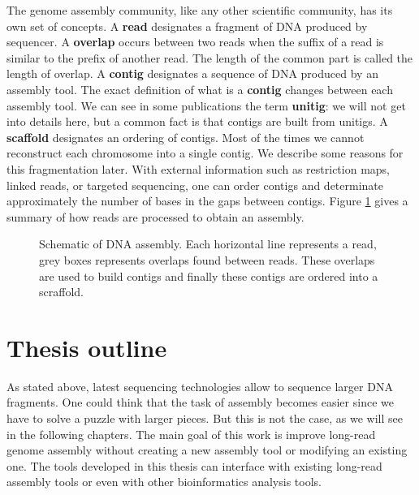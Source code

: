 \documentclass[./main.tex]{subfiles}
\begin{document}
\bigskip

The genome assembly community, like any other scientific community, has its own set of concepts. 
%
A \textbf{read} designates a fragment of DNA produced by sequencer.
%
A \textbf{overlap} occurs between two reads when the suffix of a read is similar to the prefix of another read. The length of the common part is called the length of overlap.
%
A \textbf{contig} designates a sequence of DNA produced by an assembly tool. The exact definition of what is a \textbf{contig} changes between each assembly tool. We can see in some publications the term \textbf{unitig}: we will not get into details here, but a common fact is that contigs are built from unitigs.
%
A \textbf{scaffold} designates an ordering of contigs. Most of the times we cannot reconstruct each chromosome into a single contig. We describe some reasons for this fragmentation later. With external information such as restriction maps, linked reads, or targeted sequencing, one can order contigs and determinate approximately the number of bases in the gaps between contigs. %
%
Figure \ref{intro:fig:assembly} gives a summary of how reads are processed to obtain an assembly.
\begin{figure}[ht]
	\centering
	
	\caption{Schematic of DNA assembly. Each horizontal line represents a read, grey boxes represents overlaps found between reads. These overlaps are used to build contigs and finally these contigs are ordered into a scraffold.}
    \label{intro:fig:assembly}
\end{figure}

\section{Thesis outline}


As stated above, latest sequencing technologies allow to sequence larger DNA fragments. One could think that the task of assembly becomes easier since we have to solve a puzzle with larger pieces. But this is not the case, as we will see in the following chapters. The main goal of this work is improve long-read genome assembly without creating a new assembly tool or modifying an existing one. The tools developed in this thesis can interface with existing long-read assembly tools or even with other bioinformatics analysis tools.
\end{document}
